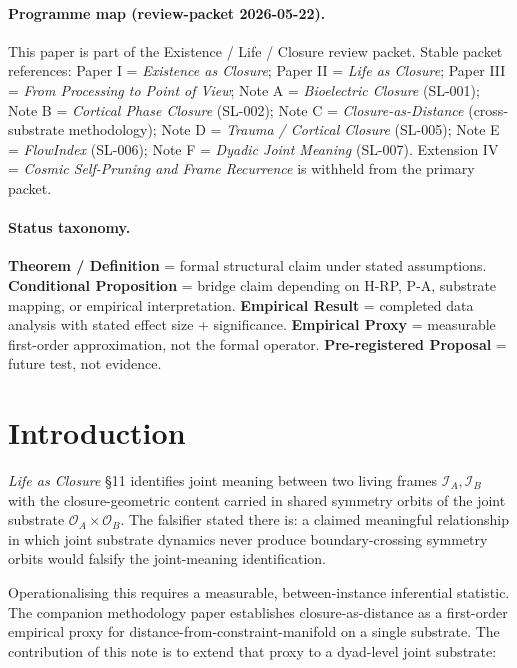 \documentclass[11pt,a4paper]{article}
\begin{document}
\paragraph{Programme map (review-packet 2026-05-22).}
This paper is part of the Existence / Life / Closure review packet. Stable packet references:
Paper I = \emph{Existence as Closure};
Paper II = \emph{Life as Closure};
Paper III = \emph{From Processing to Point of View};
Note A = \emph{Bioelectric Closure} (SL-001);
Note B = \emph{Cortical Phase Closure} (SL-002);
Note C = \emph{Closure-as-Distance} (cross-substrate methodology);
Note D = \emph{Trauma / Cortical Closure} (SL-005);
Note E = \emph{FlowIndex} (SL-006);
Note F = \emph{Dyadic Joint Meaning} (SL-007).
Extension IV = \emph{Cosmic Self-Pruning and Frame Recurrence} is withheld from the primary packet.

\paragraph{Status taxonomy.}
\textbf{Theorem / Definition} = formal structural claim under stated assumptions.
\textbf{Conditional Proposition} = bridge claim depending on H-RP, P-A, substrate mapping, or empirical interpretation.
\textbf{Empirical Result} = completed data analysis with stated effect size + significance.
\textbf{Empirical Proxy} = measurable first-order approximation, not the formal operator.
\textbf{Pre-registered Proposal} = future test, not evidence.



\section{Introduction}\label{sec:intro}

\emph{Life as Closure} \citep{SmartLifeAsClosure} \S 11 identifies joint meaning between two living frames $\mathcal{I}_A, \mathcal{I}_B$ with the closure-geometric content carried in shared symmetry orbits of the joint substrate $\mathcal{O}_A \times \mathcal{O}_B$. The falsifier stated there is: a claimed meaningful relationship in which joint substrate dynamics never produce boundary-crossing symmetry orbits would falsify the joint-meaning identification.

Operationalising this requires a measurable, between-instance inferential statistic. The companion methodology paper \citep{SmartClosureDistance} establishes closure-as-distance as a first-order empirical proxy for distance-from-constraint-manifold on a single substrate. The contribution of this note is to extend that proxy to a dyad-level joint substrate:
\end{document}
